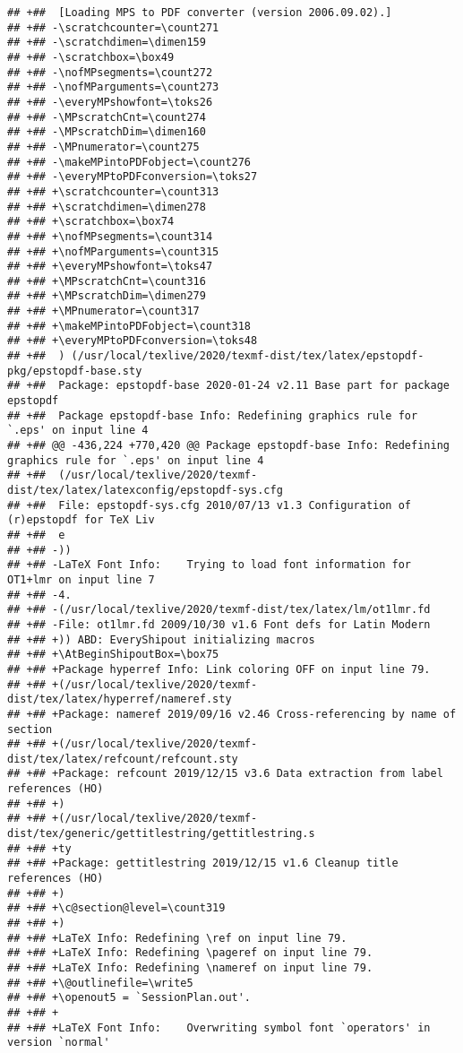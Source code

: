 \documentclass[ignorenonframetext,]{beamer}
\begin{document}
\begin{verbatim}
## +##  [Loading MPS to PDF converter (version 2006.09.02).]
## +## -\scratchcounter=\count271
## +## -\scratchdimen=\dimen159
## +## -\scratchbox=\box49
## +## -\nofMPsegments=\count272
## +## -\nofMParguments=\count273
## +## -\everyMPshowfont=\toks26
## +## -\MPscratchCnt=\count274
## +## -\MPscratchDim=\dimen160
## +## -\MPnumerator=\count275
## +## -\makeMPintoPDFobject=\count276
## +## -\everyMPtoPDFconversion=\toks27
## +## +\scratchcounter=\count313
## +## +\scratchdimen=\dimen278
## +## +\scratchbox=\box74
## +## +\nofMPsegments=\count314
## +## +\nofMParguments=\count315
## +## +\everyMPshowfont=\toks47
## +## +\MPscratchCnt=\count316
## +## +\MPscratchDim=\dimen279
## +## +\MPnumerator=\count317
## +## +\makeMPintoPDFobject=\count318
## +## +\everyMPtoPDFconversion=\toks48
## +##  ) (/usr/local/texlive/2020/texmf-dist/tex/latex/epstopdf-pkg/epstopdf-base.sty
## +##  Package: epstopdf-base 2020-01-24 v2.11 Base part for package epstopdf
## +##  Package epstopdf-base Info: Redefining graphics rule for `.eps' on input line 4
## +## @@ -436,224 +770,420 @@ Package epstopdf-base Info: Redefining graphics rule for `.eps' on input line 4
## +##  (/usr/local/texlive/2020/texmf-dist/tex/latex/latexconfig/epstopdf-sys.cfg
## +##  File: epstopdf-sys.cfg 2010/07/13 v1.3 Configuration of (r)epstopdf for TeX Liv
## +##  e
## +## -))
## +## -LaTeX Font Info:    Trying to load font information for OT1+lmr on input line 7
## +## -4.
## +## -(/usr/local/texlive/2020/texmf-dist/tex/latex/lm/ot1lmr.fd
## +## -File: ot1lmr.fd 2009/10/30 v1.6 Font defs for Latin Modern
## +## +)) ABD: EveryShipout initializing macros
## +## +\AtBeginShipoutBox=\box75
## +## +Package hyperref Info: Link coloring OFF on input line 79.
## +## +(/usr/local/texlive/2020/texmf-dist/tex/latex/hyperref/nameref.sty
## +## +Package: nameref 2019/09/16 v2.46 Cross-referencing by name of section
## +## +(/usr/local/texlive/2020/texmf-dist/tex/latex/refcount/refcount.sty
## +## +Package: refcount 2019/12/15 v3.6 Data extraction from label references (HO)
## +## +)
## +## +(/usr/local/texlive/2020/texmf-dist/tex/generic/gettitlestring/gettitlestring.s
## +## +ty
## +## +Package: gettitlestring 2019/12/15 v1.6 Cleanup title references (HO)
## +## +)
## +## +\c@section@level=\count319
## +## +)
## +## +LaTeX Info: Redefining \ref on input line 79.
## +## +LaTeX Info: Redefining \pageref on input line 79.
## +## +LaTeX Info: Redefining \nameref on input line 79.
## +## +\@outlinefile=\write5
## +## +\openout5 = `SessionPlan.out'.
## +## +
## +## +LaTeX Font Info:    Overwriting symbol font `operators' in version `normal'

\end{verbatim}
\end{document}
